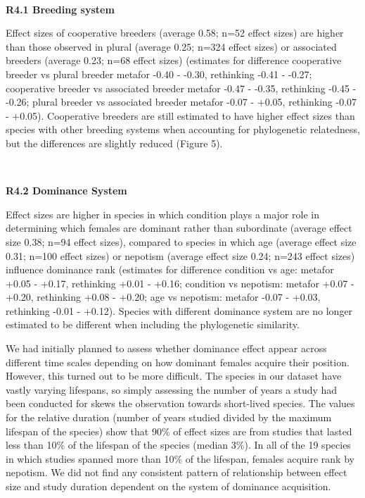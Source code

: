 \documentclass[
]{article}
\begin{document}
~

\textbf{R4.1 Breeding system}

Effect sizes of cooperative breeders (average 0.58; n=52 effect sizes)
are higher than those observed in plural (average 0.25; n=324 effect
sizes) or associated breeders (average 0.23; n=68 effect sizes)
(estimates for difference cooperative breeder vs plural breeder metafor
-0.40 - -0.30, rethinking -0.41 - -0.27; cooperative breeder vs
associated breeder metafor -0.47 - -0.35, rethinking -0.45 - -0.26;
plural breeder vs associated breeder metafor -0.07 - +0.05, rethinking
-0.07 - +0.05). Cooperative breeders are still estimated to have higher
effect sizes than species with other breeding systems when accounting
for phylogenetic relatedness, but the differences are slightly reduced
(Figure 5).

~

\textbf{R4.2 Dominance System}

Effect sizes are higher in species in which condition plays a major role
in determining which females are dominant rather than subordinate
(average effect size 0.38; n=94 effect sizes), compared to species in
which age (average effect size 0.31; n=100 effect sizes) or nepotism
(average effect size 0.24; n=243 effect sizes) influence dominance rank
(estimates for difference condition vs age: metafor +0.05 - +0.17,
rethinking +0.01 - +0.16; condition vs nepotism: metafor +0.07 - +0.20,
rethinking +0.08 - +0.20; age vs nepotism: metafor -0.07 - +0.03,
rethinking -0.01 - +0.12). Species with different dominance system are
no longer estimated to be different when including the phylogenetic
similarity.

We had initially planned to assess whether dominance effect appear
across different time scales depending on how dominant females acquire
their position. However, this turned out to be more difficult. The
species in our dataset have vastly varying lifespans, so simply
assessing the number of years a study had been conducted for skews the
observation towards short-lived species. The values for the relative
duration (number of years studied divided by the maximum lifespan of the
species) show that 90\% of effect sizes are from studies that lasted
less than 10\% of the lifespan of the species (median 3\%). In all of
the 19 species in which studies spanned more than 10\% of the lifespan,
females acquire rank by nepotism. We did not find any consistent pattern
of relationship between effect size and study duration dependent on the
system of dominance acquisition.
\end{document}
